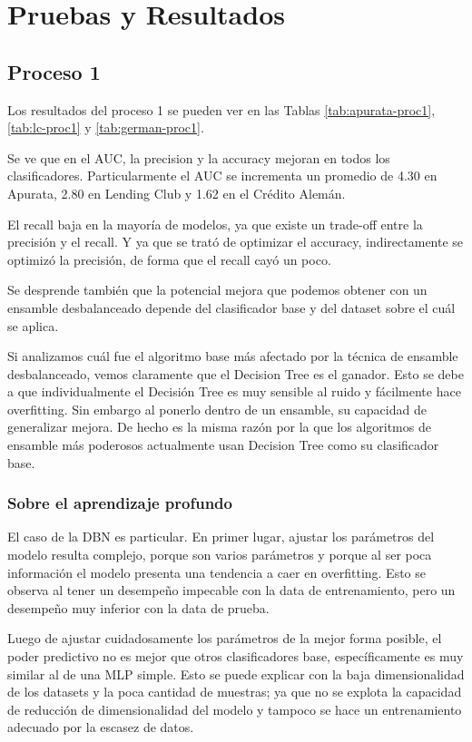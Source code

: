 \chapter{Pruebas y Resultados}

\section{Proceso 1} %

Los resultados del proceso 1 se pueden ver en las Tablas \ref{tab:apurata-proc1}, \ref{tab:lc-proc1} y \ref{tab:german-proc1}.

Se ve que en el AUC, la precision y la accuracy mejoran en todos los clasificadores. Particularmente el AUC se incrementa un promedio de 4.30 en Apurata, 2.80 en Lending Club y 1.62 en el Crédito Alemán.

El recall baja en la mayoría de modelos, ya que existe un trade-off entre la precisión y el recall. Y ya que se trató de optimizar el accuracy, indirectamente se optimizó la precisión, de forma que el recall cayó un poco.

Se desprende también que la potencial mejora que podemos obtener con un ensamble desbalanceado depende del clasificador base y del dataset sobre el cuál se aplica. 

Si analizamos cuál fue el algoritmo base más afectado por la técnica de ensamble desbalanceado, vemos claramente que el Decision Tree es el ganador. Esto se debe a que individualmente el Decisión Tree es muy sensible al ruido y fácilmente hace overfitting. Sin embargo al ponerlo dentro de un ensamble, su capacidad de generalizar mejora. De hecho es la misma razón por la que los algoritmos de ensamble más poderosos actualmente usan Decision Tree como su clasificador base.

\subsection{Sobre el aprendizaje profundo}

El caso de la \ac{DBN} es particular. En primer lugar, ajustar los parámetros del modelo resulta complejo, porque son varios parámetros y porque al ser poca información el modelo presenta una tendencia a caer en overfitting. Esto se observa al tener un desempeño impecable con la data de entrenamiento, pero un desempeño muy inferior con la data de prueba.

Luego de ajustar cuidadosamente los parámetros de la mejor forma posible, el poder predictivo no es mejor que otros clasificadores base, específicamente es muy similar al de una \ac{MLP} simple. Esto se puede explicar con la baja dimensionalidad de los datasets y la poca cantidad de muestras; ya que no se explota la capacidad de reducción de dimensionalidad del modelo y tampoco se hace un entrenamiento adecuado por la escasez de datos.

